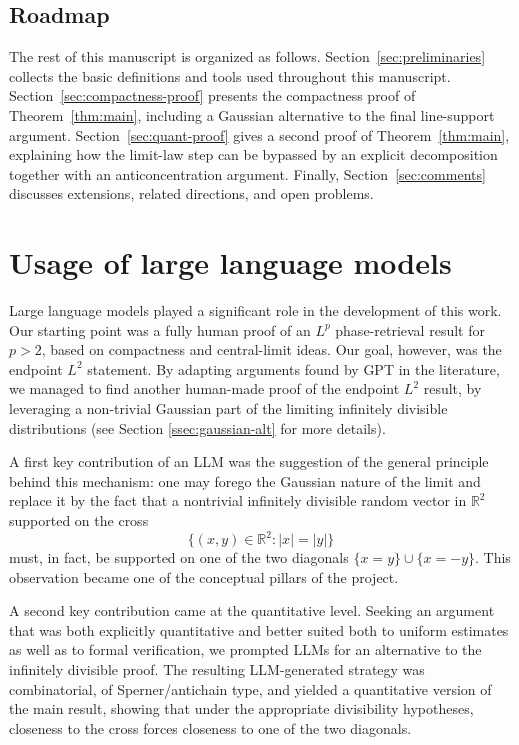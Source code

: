 \documentclass[11pt]{amsart}
\numberwithin{equation}{section}
\theoremstyle{definition}
\theoremstyle{remark}
\newcommand{\R}{\mathbb R}
\begin{document}
\subsection{Roadmap}
The rest of this manuscript is organized as follows.   Section~\ref{sec:preliminaries} collects
the basic definitions and tools used throughout this manuscript. 
Section~\ref{sec:compactness-proof}  presents the compactness proof of
Theorem~\ref{thm:main}, including a Gaussian alternative to the final
line-support argument.  Section~\ref{sec:quant-proof} gives a second proof of
Theorem~\ref{thm:main}, explaining how the limit-law step can be bypassed by an
explicit decomposition together with an anticoncentration argument.
Finally, Section~\ref{sec:comments} discusses extensions, related directions,
and open problems.   

\section*{Usage of large language models} 

Large language models played a significant role in the development of this work. Our starting point was a fully human proof of an $L^p$ phase-retrieval result for $p> 2$, based on compactness and central-limit ideas. Our goal, however, was the endpoint $L^2$ statement. By adapting arguments found by GPT in the literature, we managed to find another human-made proof of the endpoint $L^2$ result, by leveraging a non-trivial Gaussian part of the limiting infinitely divisible distributions (see Section \ref{ssec:gaussian-alt} for more details). 

A first key contribution of an LLM was the suggestion of the general principle behind this mechanism: one may forego the Gaussian nature of the limit and replace it by the fact that a nontrivial infinitely divisible random vector in $\R^2$ supported on the cross 
$$\{ (x,y) \in \R^2 \colon |x| = |y|\}$$
must, in fact, be supported on one of the two diagonals $\{x=y\}\cup \{x=-y\}.$ This observation became one of the conceptual pillars of the project. 

A second key contribution came at the quantitative level. Seeking an argument that was both explicitly quantitative and better suited both to uniform estimates as well as to formal verification, we prompted LLMs for an alternative to the infinitely divisible proof. The resulting LLM-generated strategy was combinatorial, of Sperner/antichain type, and yielded a quantitative version of the main result, showing that under the appropriate divisibility hypotheses, closeness to the cross forces closeness to one of the two diagonals. 
\end{document}
